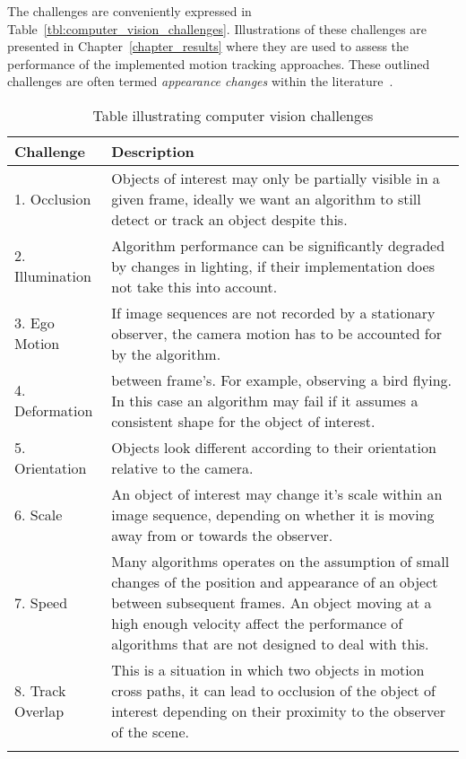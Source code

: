 The challenges are conveniently expressed in
Table~\ref{tbl:computer_vision_challenges}. Illustrations of these challenges
are presented in Chapter~\ref{chapter_results} where they are used to assess the
performance of the implemented motion tracking approaches. These outlined challenges
are often termed \textit{appearance changes} within the
literature~\cite{Li2013}. 

\newpage
\begin{longtable}{p{5cm}  p{8cm}}
    \hline
    \textbf{Challenge} & \textbf{Description} \\ 
    \hline\hline    
    1. Occlusion
    & 
    Objects of interest may only be partially visible in a
    given frame, ideally we want an algorithm to still detect or
    track an object despite this.
    \\ \bottomrule
    
    2. Illumination
    &
    Algorithm performance can be significantly degraded by changes
    in lighting, if their implementation does not take this into
    account.
    \\ \bottomrule
    
    3. Ego Motion
    &
    If image sequences are not recorded by a stationary observer,
    the camera motion has to be accounted for by the algorithm.
    \\ \bottomrule
    
    4. Deformation
    &
    between frame's. For example, observing a bird flying. In this
    case an algorithm may fail if it assumes a consistent shape for
    the object of interest.
    \\ \bottomrule

    5. Orientation
    &
    Objects look different according to their orientation relative
    to the camera.
    \\ \bottomrule

    6. Scale
    &
    An object of interest may change it's scale within an image
    sequence, depending on whether it is moving away from or towards
    the observer.
    \\ \bottomrule

    7. Speed 
    &
    Many algorithms operates on the assumption of small
    changes of the position and appearance of an object between
    subsequent frames. An object moving at a high enough velocity
    affect the performance of algorithms that are not designed to
    deal with this.
    \\ \bottomrule
  
    8. Track Overlap
    &
    This is a situation in which two objects in motion cross paths, it can lead
    to occlusion of the object of interest depending on their proximity to the
    observer of the scene.
    \\ \bottomrule

    \caption{Table illustrating computer vision challenges}
\end{longtable}\label{tbl:computer_vision_challenges}
\newpage

